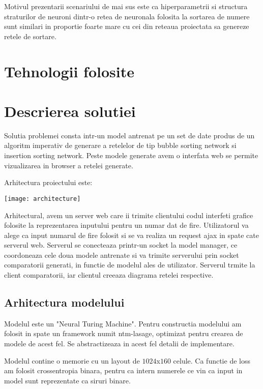 \documentclass{article}%
\begin{document}
Motivul prezentarii scenariului de mai sus este ca hiperparametrii si structura straturilor de neuroni dintr-o retea de neuronala folosita la sortarea de numere sunt similari in proportie foarte mare cu cei din reteaua proiectata sa genereze retele de sortare.

\section{Tehnologii folosite}


\section{Descrierea solutiei}
Solutia problemei consta intr-un model antrenat pe un set de date produs de un algoritm imperativ de generare a retelelor de tip bubble sorting network si insertion sorting network. Peste modele generate avem o interfata web se permite vizualizarea in browser a retelei generate.

Arhitectura proiectului este:

\begin{center}
\texttt{[image: architecture]}
\end{center}

Arhitectural, avem un server web care ii trimite clientului codul interfeti grafice folosite la reprezentarea inputului pentru un numar dat de fire. Utilizatorul va alege ca input numarul de fire folosit si se va realiza un request ajax in spate cate serverul web. Serverul se conecteaza printr-un socket la model manager, ce coordoneaza cele doua modele antrenate si va trimite serverului prin socket comparatorii generati, in functie de modelul ales de utilizator. Serverul trmite la client comparatorii, iar clientul creeaza diagrama retelei respective.

\subsection{Arhitectura modelului}

Modelul este un "Neural Turing Machine". Pentru constructia modelului am folosit in spate un framework numit ntm-lasage, optimizat pentru crearea de modele de acest fel. Se abstractizeaza in acest fel detalii de implementare. 

Modelul contine o memorie cu un layout de $1024$x$160$ celule. Ca functie de loss am folosit crossentropia binara, pentru ca intern numerele ce vin ca input in model sunt reprezentate ca siruri binare.
\end{document}
